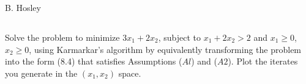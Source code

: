 \documentclass[12pt]{amsart}
\begin{document}
\raggedbottom

\hspace{\fill} {\large B. Hosley}
\bigskip


\setcounter{section}{8}
\setcounter{subsection}{0}
\subsection{}
Solve the problem to minimize  \(3x_1 + 2x_2\), subject to \(x_1 + 2x_2 > 2\) and \(x_1 \geq 0\), 
\(x_2 \geq 0\), using Karmarkar's algorithm by equivalently transforming the problem into 
the form (8.4) that satisfies Assumptions (\(Al\)) and (\(A2\)). Plot the iterates you 
generate in the \(( x_1 ,x_2 )\) space.
\end{document}
